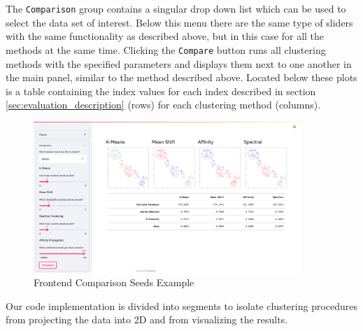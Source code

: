 The \texttt{Comparison} group contains a singular drop down list which can be used to select the data set of interest. Below this menu there are the same type of sliders with the same functionality as described above, but in this case for all the methods at the same time. Clicking the \texttt{Compare} button runs all clustering methods with the specified parameters and displays them next to one another in the main panel, similar to the method described above. Located below these plots is a table containing the index values for each index described in section \ref{sec:evaluation_description} (rows) for each clustering method (columns).

\begin{figure}[H]
%
\begin{center}
\includegraphics[width=0.9\textwidth]{images/frontend_comparison.png}
\caption{Frontend Comparison Seeds Example}
\end{center}
\label{img:frontend_screenshot_comparison}
\end{figure}

Our code implementation is divided into segments to isolate clustering procedures from projecting the data into 2D and from visualizing the results.

